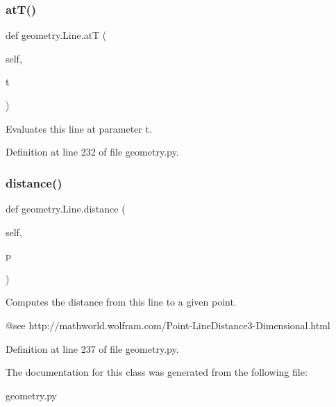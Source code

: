 \subsubsection{\texorpdfstring{at\+T()}{atT()}}
{\footnotesize\ttfamily def geometry.\+Line.\+atT (\begin{DoxyParamCaption}\item[{}]{self,  }\item[{}]{t }\end{DoxyParamCaption})}

\begin{DoxyVerb}Evaluates this line at parameter t.\end{DoxyVerb}
 

Definition at line 232 of file geometry.\+py.

\mbox{\label{classgeometry_1_1Line_ac6b10e2377ad195ca3c2a6148b1aa770}} 
\subsubsection{\texorpdfstring{distance()}{distance()}}
{\footnotesize\ttfamily def geometry.\+Line.\+distance (\begin{DoxyParamCaption}\item[{}]{self,  }\item[{}]{p }\end{DoxyParamCaption})}

\begin{DoxyVerb}Computes the distance from this line to a given point.

   @see http://mathworld.wolfram.com/Point-LineDistance3-Dimensional.html
\end{DoxyVerb}
 

Definition at line 237 of file geometry.\+py.



The documentation for this class was generated from the following file\+:\begin{DoxyCompactItemize}
\item 
geometry.\+py\end{DoxyCompactItemize}
